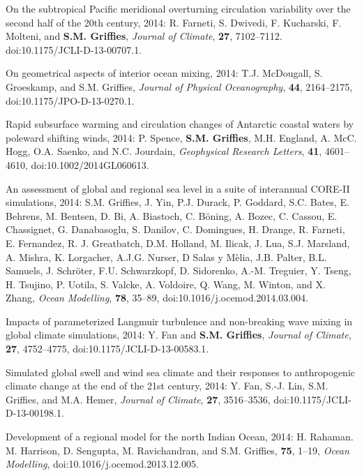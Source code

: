 \begin{etaremune}
\item On the subtropical Pacific meridional overturning circulation
  variability over the second half of the 20th century, 2014:
  R. Farneti, S. Dwivedi, F. Kucharski, F. Molteni, and {\bf
    S.M. Grif\/f\/ies}, {\it Journal of Climate}, {\bf 27},
  7102--7112.  doi:10.1175/JCLI-D-13-00707.1.

\item On geometrical aspects of interior ocean mixing, 2014:  T.J. McDougall, S. Groeskamp, and S.M. Grif\/f\/ies, {\it Journal of Physical Oceanography}, {\bf 44}, 2164--2175, doi:10.1175/JPO-D-13-0270.1.

\item Rapid subsurface warming and circulation changes of Antarctic
  coastal waters by poleward shifting winds, 2014: P. Spence, {\bf
    S.M. Grif\/f\/ies}, M.H. England, A. McC. Hogg, O.A. Saenko, and
  N.C. Jourdain, {\it Geophysical Research Letters}, {\bf 41},
  4601--4610, doi:10.1002/2014GL060613.

\item An assessment of global and regional sea level in a suite of
  interannual CORE-II simulations, 2014: S.M. Grif\/f\/ies,
  J. Yin, P.J. Durack, P. Goddard, S.C. Bates, E. Behrens, M. Bentsen,
  D. Bi, A. Biastoch, C. B\"oning, A. Bozec, C. Cassou, E. Chassignet,
  G. Danabasoglu, S. Danilov, C. Domingues, H. Drange, R. Farneti,
  E. Fernandez, R. J. Greatbatch, D.M. Holland, M. Ilicak, J. Lua,
  S.J. Marsland, A. Mishra, K. Lorgacher, A.J.G. Nurser, D Salas y
  M\`elia, J.B.  Palter, B.L. Samuels, J. Schr\"oter, F.U. Schwarzkopf, D. Sidorenko, A.-M. Treguier, Y. Tseng,
  H. Tsujino, P. Uotila, S. Valcke, A. Voldoire, Q. Wang, M. Winton,
  and X. Zhang, {\it Ocean Modelling}, {\bf 78}, 35--89,
  doi:10.1016/j.ocemod.2014.03.004.

\item Impacts of parameterized Langmuir turbulence and non-breaking
  wave mixing in global climate simulations, 2014: Y. Fan and {\bf
    S.M. Grif\/f\/ies}, {\it Journal of Climate}, {\bf 27},
  4752--4775, doi:10.1175/JCLI-D-13-00583.1.

\item Simulated global swell and wind sea climate and their responses
  to anthropogenic climate change at the end of the 21st century,
  2014: Y. Fan, S.-J. Lin, S.M. Grif\/f\/ies, and M.A. Hemer,
  {\it Journal of Climate}, {\bf 27}, 3516--3536,
  doi:10.1175/JCLI-D-13-00198.1.

\item Development of a regional model for the north Indian Ocean,
  2014: H. Rahaman. M. Harrison, D. Sengupta, M.  Ravichandran, and
  S.M. Grif\/f\/ies, {\bf 75}, 1--19, {\it Ocean Modelling},
  doi:10.1016/j.ocemod.2013.12.005.


\end{etaremune}
